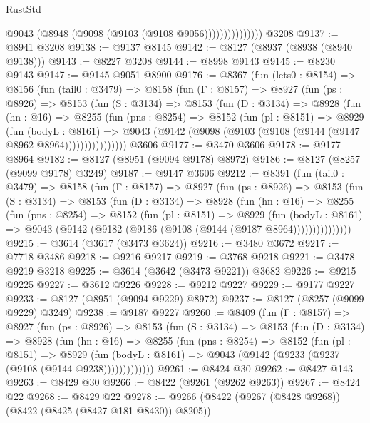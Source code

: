 \begin{lexlean}{RustStd}
\begin{coremodule}
                        @9043 (@8948 (@9098 (@9103 (@9108 @9056)))))))))))))))
    @3208
@9137 := @8941 @3208
@9138 := @9137 @8145
@9142 := @8127 (@8937 (@8938 (@8940 @9138)))
@9143 := @8227 @3208
@9144 := @8998 @9143
@9145 := @8230 @9143
@9147 := @9145 @9051 @8900
@9176 := @8367
    (fun (lets0 : @8154) =>
    @8156
      (fun (tail0 : @3479) =>
      @8158
        (fun (Γ : @8157) =>
        @8927
          (fun (ps : @8926) =>
          @8153
            (fun (S : @3134) =>
            @8153
              (fun (D : @3134) =>
              @8928
                (fun (hn : @16) =>
                @8255
                  (fun (pns : @8254) =>
                  @8152
                    (fun (pl : @8151) =>
                    @8929
                      (fun (bodyL : @8161) =>
                      @9043 (@9142 (@9098 (@9103 (@9108 (@9144 (@9147 @8962 @8964))))))))))))))))
    @3606
@9177 := @3470 @3606
@9178 := @9177 @8964
@9182 := @8127 (@8951 (@9094 @9178) @8972)
@9186 := @8127 (@8257 (@9099 @9178) @3249)
@9187 := @9147 @3606
@9212 := @8391
    (fun (tail0 : @3479) =>
    @8158
      (fun (Γ : @8157) =>
      @8927
        (fun (ps : @8926) =>
        @8153
          (fun (S : @3134) =>
          @8153
            (fun (D : @3134) =>
            @8928
              (fun (hn : @16) =>
              @8255
                (fun (pns : @8254) =>
                @8152
                  (fun (pl : @8151) =>
                  @8929
                    (fun (bodyL : @8161) =>
                    @9043 (@9142 (@9182 (@9186 (@9108 (@9144 (@9187 @8964)))))))))))))))
@9215 := @3614 (@3617 (@3473 @3624))
@9216 := @3480 @3672
@9217 := @7718 @3486
@9218 := @9216 @9217
@9219 := @3768 @9218
@9221 := @3478 @9219 @3218
@9225 := @3614 (@3642 (@3473 @9221)) @3682
@9226 := @9215 @9225
@9227 := @3612 @9226
@9228 := @9212 @9227
@9229 := @9177 @9227
@9233 := @8127 (@8951 (@9094 @9229) @8972)
@9237 := @8127 (@8257 (@9099 @9229) @3249)
@9238 := @9187 @9227
@9260 := @8409
    (fun (Γ : @8157) =>
    @8927
      (fun (ps : @8926) =>
      @8153
        (fun (S : @3134) =>
        @8153
          (fun (D : @3134) =>
          @8928
            (fun (hn : @16) =>
            @8255
              (fun (pns : @8254) =>
              @8152
                (fun (pl : @8151) =>
                @8929
                  (fun (bodyL : @8161) =>
                  @9043 (@9142 (@9233 (@9237 (@9108 (@9144 @9238)))))))))))))
@9261 := @8424 @30
@9262 := @8427 @143
@9263 := @8429 @30
@9266 := @8422 (@9261 (@9262 @9263))
@9267 := @8424 @22
@9268 := @8429 @22
@9278 := @9266 (@8422 (@9267 (@8428 @9268)) (@8422 (@8425 (@8427 @181 @8430)) @8205))

\end{coremodule}
\end{lexlean}
